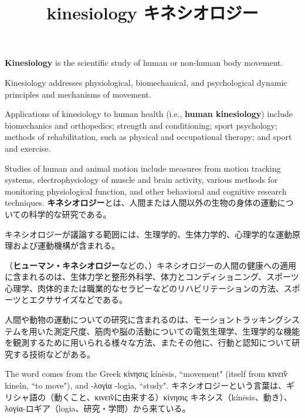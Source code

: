\documentclass[uplatex,dvipdfmx]{jsarticle} \usepackage{amsmath,amssymb,bm}
\title{kinesiology キネシオロジー} \author{} \date{}
\begin{document}
\maketitle
\begin{paracol}{2}
{\bf Kinesiology} is the scientific study of human or non-human body movement.

Kinesiology addresses physiological, biomechanical, and psychological dynamic principles and mechanisms of movement.

Applications of kinesiology to human health (i.e., {\bf human kinesiology}) include biomechanics and orthopedics; strength and conditioning; sport psychology; methods of rehabilitation, such as physical and occupational therapy; and sport and exercise.

Studies of human and animal motion include measures from motion tracking systems, electrophysiology of muscle and brain activity, various methods for monitoring physiological function, and other behavioral and cognitive research techniques.
\switchcolumn
{\bf キネシオロジー}とは、人間または人間以外の生物の身体の運動についての科学的な研究である。

キネシオロジーが議論する範囲には、生理学的、生体力学的、心理学的な運動原理および運動機構が含まれる。

（{\bf ヒューマン・キネシオロジー}などの、）キネシオロジーの人間の健康への適用に含まれるのは、生体力学と整形外科学、体力とコンディショニング、スポーツ心理学、肉体的または職業的なセラピーなどのリハビリテーションの方法、スポーツとエクササイズなどである。

人間や動物の運動についての研究に含まれるのは、モーショントラッキングシステムを用いた測定尺度、筋肉や脳の活動についての電気生理学、生理学的な機能を観測するために用いられる様々な方法、またその他に、行動と認知について研究する技術などがある。
\end{paracol}
\vspace{\baselineskip}
\begin{paracol}{2}
The word comes from the Greek κ\'ινησις k\'in\=esis, ``movement" (itself from κινε\~ιν kine\^in, ``to move"), and -λογ\'ια -logia, ``study". 
\switchcolumn
キネシオロジーという言葉は、ギリシャ語の（動くこと、κινε\~ινに由来する）κ\'ινησις キネシス（k\'in\=esis、動き）、λογ\'ια-ロギア（logia、研究・学問）から来ている。
\end{paracol}
\end{document}

